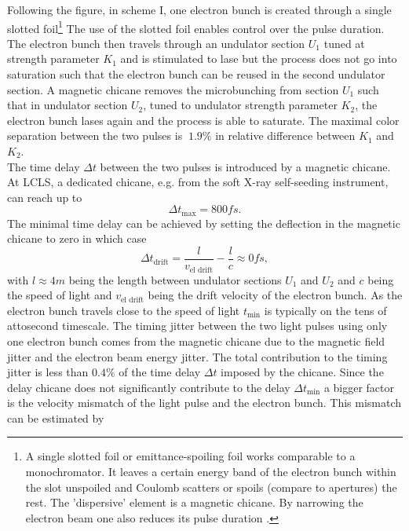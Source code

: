 Following the figure, in scheme I, one electron bunch is created through a single slotted foil\footnote{A single slotted foil or emittance-spoiling foil works comparable to a monochromator. It leaves a certain energy band of the electron bunch within the slot unspoiled and Coulomb scatters or spoils (compare to apertures) the rest. The 'dispersive' element is a magnetic chicane. By narrowing the electron beam one also reduces its pulse duration \cite{Emma-2004-PRL}.}  The use of the slotted foil enables control over the pulse duration. The electron bunch then travels through an undulator section $U_{1}$ tuned at strength parameter $K_{1}$ and is stimulated to lase but the process does not go into saturation such that the electron bunch can be reused in the second undulator section. A magnetic chicane removes the microbunching from section $U_{1}$ such that in undulator section $U_{2}$, tuned to undulator strength parameter $K_{2}$, the electron bunch lases again and the process is able to saturate. The maximal color separation between the two pulses is $~ 1.9\%$ in relative difference between $K_{1}$ and $K_{2}$.\\
The time delay $\Delta t$ between the two pulses is introduced by a magnetic chicane. At LCLS, a dedicated chicane, e.g. from the soft X-ray self-seeding instrument, can reach up to
\begin{equation}
\Delta t_{\text{max}} = 800 fs.
\label{eq:alberto-delta-t-max}
\end{equation}
The minimal time delay can be achieved by setting the deflection in the magnetic chicane to zero in which case
\begin{equation}
\Delta t_{\text{drift}} = \frac{l}{v_{\text{el drift}}} - \frac{l}{c}\approx 0 fs,
\label{eq:alberto-delta-t-min}
\end{equation}
with $l\approx 4m$ being the length between undulator sections $U_{1}$ and $U_{2}$ and $c$ being the speed of light and $v_{\text{el drift}}$ being the drift velocity of the electron bunch. As the electron bunch travels close to the speed of light $t_{\text{min}}$ is typically on the tens of attosecond timescale. The timing jitter between the two light pulses using only one electron bunch comes from the magnetic chicane due to the magnetic field jitter and the electron beam energy jitter. The total contribution to the timing jitter is less than $0.4\%$ of the time delay $\Delta t$ imposed by the chicane. Since the delay chicane does not significantly contribute to the delay $\Delta t_{\text{min}}$ a bigger factor is the velocity mismatch of the light pulse and the electron bunch. This mismatch can be estimated by
